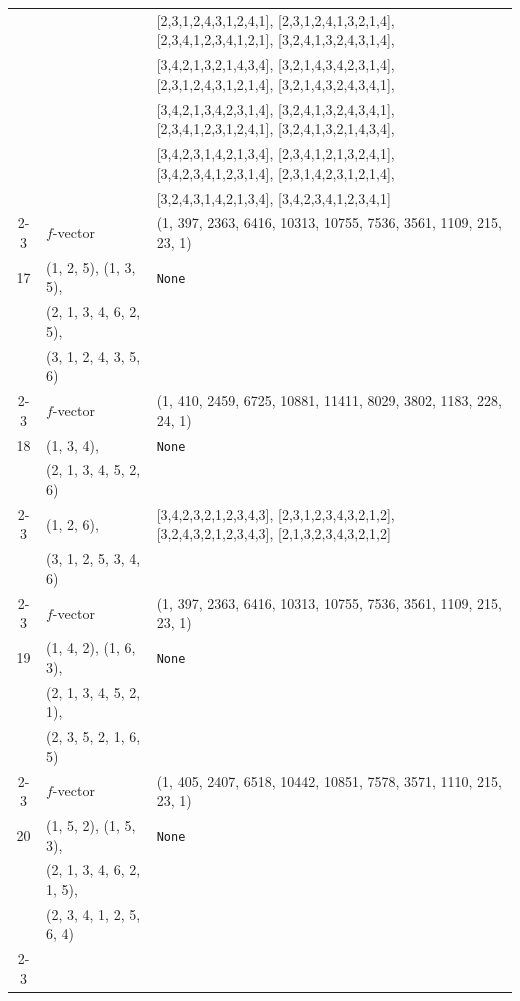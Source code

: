 \documentclass[10pt]{amsart}
\numberwithin{equation}{section}
\theoremstyle{plain}
\theoremstyle{definition}
\theoremstyle{remark}
\begin{document}
{\begin{longtable}{c|l|l}
		&  & [2,3,1,2,4,3,1,2,4,1], [2,3,1,2,4,1,3,2,1,4], [2,3,4,1,2,3,4,1,2,1], [3,2,4,1,3,2,4,3,1,4], \\
		&  & [3,4,2,1,3,2,1,4,3,4], [3,2,1,4,3,4,2,3,1,4], [2,3,1,2,4,3,1,2,1,4], [3,2,1,4,3,2,4,3,4,1], \\
		&  & [3,4,2,1,3,4,2,3,1,4], [3,2,4,1,3,2,4,3,4,1], [2,3,4,1,2,3,1,2,4,1], [3,2,4,1,3,2,1,4,3,4], \\
		&  & [3,4,2,3,1,4,2,1,3,4], [2,3,4,1,2,1,3,2,4,1], [3,4,2,3,4,1,2,3,1,4], [2,3,1,4,2,3,1,2,1,4], \\
		&  & [3,2,4,3,1,4,2,1,3,4], [3,4,2,3,4,1,2,3,4,1] \\ \cline{2-3}
		
		& $f$-vector & {(1, 397, 2363, 6416, 10313, 10755, 7536, 3561, 1109, 215, 23, 1)} \\
		\midrule
		
		17 & (1, 2, 5), (1, 3, 5), & \texttt{None} \\
		& (2, 1, 3, 4, 6, 2, 5), &  \\
		& (3, 1, 2, 4, 3, 5, 6) &  \\ \cline{2-3}
		
		& $f$-vector & {(1, 410, 2459, 6725, 10881, 11411, 8029, 3802, 1183, 228, 24, 1)} \\
		\midrule
		
		18 & (1, 3, 4), & \texttt{None} \\
		& (2, 1, 3, 4, 5, 2, 6) &  \\ \cline{2-3}
		
		& (1, 2, 6), & [3,4,2,3,2,1,2,3,4,3], [2,3,1,2,3,4,3,2,1,2], [3,2,4,3,2,1,2,3,4,3], [2,1,3,2,3,4,3,2,1,2] \\
		& (3, 1, 2, 5, 3, 4, 6) &  \\ \cline{2-3}
		
		& $f$-vector & {(1, 397, 2363, 6416, 10313, 10755, 7536, 3561, 1109, 215, 23, 1)} \\
		\midrule
		
		19 & (1, 4, 2), (1, 6, 3), & \texttt{None} \\
		& (2, 1, 3, 4, 5, 2, 1), &  \\
		& (2, 3, 5, 2, 1, 6, 5) &  \\ \cline{2-3}
		
		& $f$-vector & {(1, 405, 2407, 6518, 10442, 10851, 7578, 3571, 1110, 215, 23, 1)} \\
		\midrule
		
		20 & (1, 5, 2), (1, 5, 3), & \texttt{None} \\
		& (2, 1, 3, 4, 6, 2, 1, 5), &  \\
		& (2, 3, 4, 1, 2, 5, 6, 4) &  \\ \cline{2-3}
		

\end{longtable}}
\end{document}
